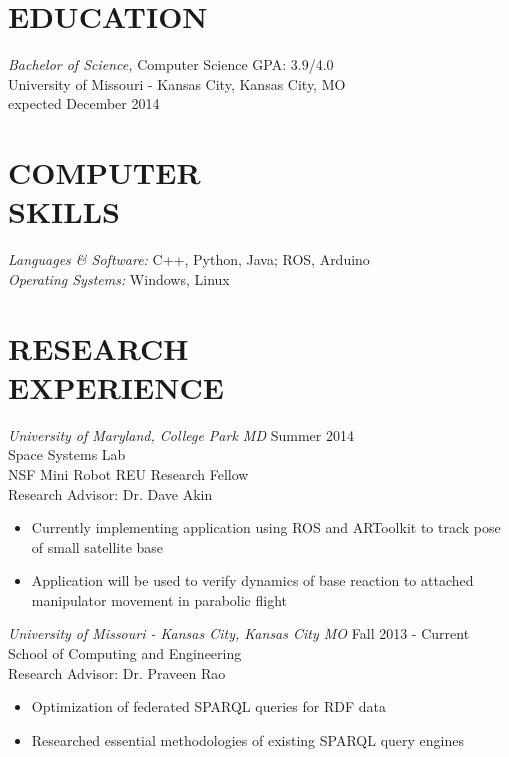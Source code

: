 \documentclass[line,margin]{res}
\begin{document}
\address{\hfill (913)235-1070 \textbar \textbar \hspace{1 mm}  victoria.chen.wu@gmail.com \textbar \textbar \hspace{1 mm} github.com/vptarmigan} 

 
\begin{resume}
 
\section{EDUCATION} {\sl Bachelor of Science,} Computer Science	\hfill GPA: 3.9/4.0\\
                University of Missouri - Kansas City, Kansas City, MO \\
                expected December 2014 
\section{COMPUTER \\ SKILLS} {\sl Languages \& Software:} 
		C++, Python, Java; ROS, Arduino \\
                {\sl Operating Systems:} Windows, Linux 
\section {RESEARCH \\ EXPERIENCE}
	{\sl University of Maryland, College Park MD}  \hfill  Summer 2014\\
		Space Systems Lab\\
		NSF Mini Robot REU Research Fellow \\
		Research Advisor: Dr. Dave Akin 
                 \begin{itemize}[leftmargin=5mm]  \itemsep -2pt %
		 \item Currently implementing application using ROS and ARToolkit to track pose of small satellite base
		 \item Application will be used to verify dynamics of base reaction to attached manipulator movement in parabolic flight 
                 \end{itemize} 
	


		{\sl University of Missouri - Kansas City, Kansas City MO} \hfill Fall 2013 - Current \\
		School of Computing and Engineering \\
		Research Advisor: Dr. Praveen Rao
		 \begin{itemize} [leftmargin=5mm]  \itemsep -2pt %
		 \item  Optimization of federated SPARQL queries for RDF data
		\item   Researched essential methodologies of existing SPARQL query engines 
		\end{itemize}



\end{resume}
\end{document}
